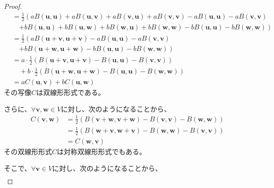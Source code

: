 \documentclass[dvipdfmx]{jsarticle}
\begin{document}
\begin{proof}
\begin{align*}
&= \frac{1}{2}\left( aB\left( \mathbf{u},\mathbf{u} \right) + aB\left( \mathbf{u},\mathbf{v} \right) + aB\left( \mathbf{v},\mathbf{u} \right) + aB\left( \mathbf{v},\mathbf{v} \right) - aB\left( \mathbf{u},\mathbf{u} \right) - aB\left( \mathbf{v},\mathbf{v} \right) \right. \\
&\quad \left. + bB\left( \mathbf{u},\mathbf{u} \right) + bB\left( \mathbf{u},\mathbf{w} \right) + bB\left( \mathbf{w},\mathbf{u} \right) + bB\left( \mathbf{w},\mathbf{w} \right) - bB\left( \mathbf{u},\mathbf{u} \right) - bB\left( \mathbf{w},\mathbf{w} \right) \right)\\
&= \frac{1}{2}\left( aB\left( \mathbf{u} + \mathbf{v},\mathbf{u} + \mathbf{v} \right) - aB\left( \mathbf{u},\mathbf{u} \right) - aB\left( \mathbf{v},\mathbf{v} \right) \right. \\
&\quad \left. + bB\left( \mathbf{u} + \mathbf{w},\mathbf{u} + \mathbf{w} \right) - bB\left( \mathbf{u},\mathbf{u} \right) - bB\left( \mathbf{w},\mathbf{w} \right) \right)\\
&= a \cdot \frac{1}{2}\left( B\left( \mathbf{u} + \mathbf{v},\mathbf{u} + \mathbf{v} \right) - B\left( \mathbf{u},\mathbf{u} \right) - B\left( \mathbf{v},\mathbf{v} \right) \right) \\
&\quad + b \cdot \frac{1}{2}\left( B\left( \mathbf{u} + \mathbf{w},\mathbf{u} + \mathbf{w} \right) - B\left( \mathbf{u},\mathbf{u} \right) - B\left( \mathbf{w},\mathbf{w} \right) \right)\\
&= aC\left( \mathbf{u},\mathbf{v} \right) + bC\left( \mathbf{u},\mathbf{w} \right)
\end{align*}
その写像$C$は双線形形式である。\par
さらに、$\forall\mathbf{v},\mathbf{w} \in V$に対し、次のようになることから、
\begin{align*}
C\left( \mathbf{v},\mathbf{w} \right) &= \frac{1}{2}\left( B\left( \mathbf{v} + \mathbf{w},\mathbf{v} + \mathbf{w} \right) - B\left( \mathbf{v},\mathbf{v} \right) - B\left( \mathbf{w},\mathbf{w} \right) \right)\\
&= \frac{1}{2}\left( B\left( \mathbf{w} + \mathbf{v},\mathbf{w} + \mathbf{v} \right) - B\left( \mathbf{w},\mathbf{w} \right) - B\left( \mathbf{v},\mathbf{v} \right) \right)\\
&= C\left( \mathbf{w},\mathbf{v} \right)
\end{align*}
その双線形形式$C$は対称双線形形式でもある。\par
そこで、$\forall\mathbf{v} \in V$に対し、次のようになることから、
\begin{align*}

\end{align*}
\end{proof}
\end{document}
